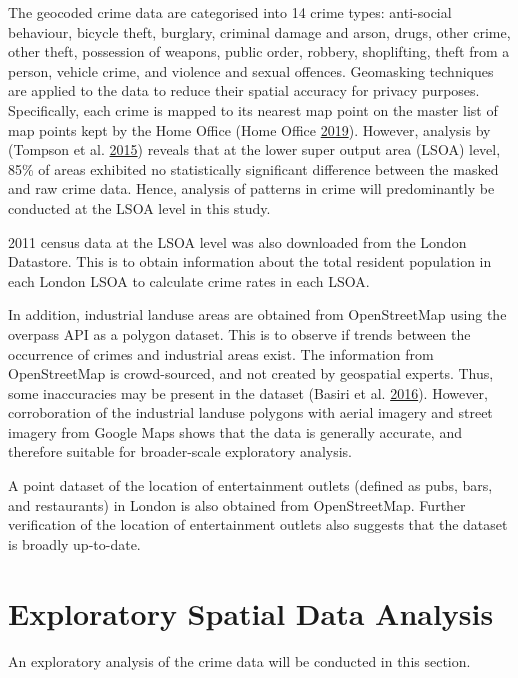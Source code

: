 \documentclass[]{article}
\theoremstyle{definition}
\theoremstyle{definition}
\theoremstyle{definition}
\theoremstyle{remark}
\begin{document}
The geocoded crime data are categorised into 14 crime types: anti-social
behaviour, bicycle theft, burglary, criminal damage and arson, drugs,
other crime, other theft, possession of weapons, public order, robbery,
shoplifting, theft from a person, vehicle crime, and violence and sexual
offences. Geomasking techniques are applied to the data to reduce their
spatial accuracy for privacy purposes. Specifically, each crime is
mapped to its nearest map point on the master list of map points kept by
the Home Office (Home Office \protect\hyperlink{ref-Office2019}{2019}).
However, analysis by (Tompson et al.
\protect\hyperlink{ref-Tompson2015}{2015}) reveals that at the lower
super output area (LSOA) level, 85\% of areas exhibited no statistically
significant difference between the masked and raw crime data. Hence,
analysis of patterns in crime will predominantly be conducted at the
LSOA level in this study.

2011 census data at the LSOA level was also downloaded from the London
Datastore. This is to obtain information about the total resident
population in each London LSOA to calculate crime rates in each LSOA.

In addition, industrial landuse areas are obtained from OpenStreetMap
using the overpass API as a polygon dataset. This is to observe if
trends between the occurrence of crimes and industrial areas exist. The
information from OpenStreetMap is crowd-sourced, and not created by
geospatial experts. Thus, some inaccuracies may be present in the
dataset (Basiri et al. \protect\hyperlink{ref-Basiri2016}{2016}).
However, corroboration of the industrial landuse polygons with aerial
imagery and street imagery from Google Maps shows that the data is
generally accurate, and therefore suitable for broader-scale exploratory
analysis.

A point dataset of the location of entertainment outlets (defined as
pubs, bars, and restaurants) in London is also obtained from
OpenStreetMap. Further verification of the location of entertainment
outlets also suggests that the dataset is broadly up-to-date.

\pagebreak

\section{Exploratory Spatial Data
Analysis}\label{exploratory-spatial-data-analysis}

An exploratory analysis of the crime data will be conducted in this
section.
\end{document}
